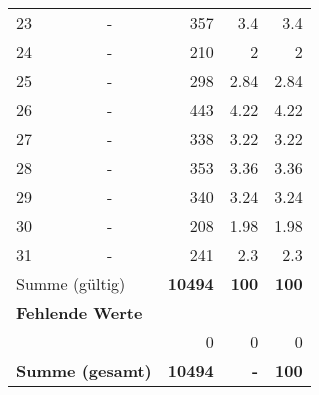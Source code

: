 \begin{longtable}{lXrrr}
        23 & \multicolumn{1}{X}{-} & %
          \num{357} &
          \num[round-mode=places,round-precision=2]{3,4} &
          \num[round-mode=places,round-precision=2]{3,4} \\

        24 & \multicolumn{1}{X}{-} & %
          \num{210} &
          \num[round-mode=places,round-precision=2]{2} &
          \num[round-mode=places,round-precision=2]{2} \\

        25 & \multicolumn{1}{X}{-} & %
          \num{298} &
          \num[round-mode=places,round-precision=2]{2,84} &
          \num[round-mode=places,round-precision=2]{2,84} \\

        26 & \multicolumn{1}{X}{-} & %
          \num{443} &
          \num[round-mode=places,round-precision=2]{4,22} &
          \num[round-mode=places,round-precision=2]{4,22} \\

        27 & \multicolumn{1}{X}{-} & %
          \num{338} &
          \num[round-mode=places,round-precision=2]{3,22} &
          \num[round-mode=places,round-precision=2]{3,22} \\

        28 & \multicolumn{1}{X}{-} & %
          \num{353} &
          \num[round-mode=places,round-precision=2]{3,36} &
          \num[round-mode=places,round-precision=2]{3,36} \\

        29 & \multicolumn{1}{X}{-} & %
          \num{340} &
          \num[round-mode=places,round-precision=2]{3,24} &
          \num[round-mode=places,round-precision=2]{3,24} \\

        30 & \multicolumn{1}{X}{-} & %
          \num{208} &
          \num[round-mode=places,round-precision=2]{1,98} &
          \num[round-mode=places,round-precision=2]{1,98} \\

        31 & \multicolumn{1}{X}{-} & %
          \num{241} &
          \num[round-mode=places,round-precision=2]{2,3} &
          \num[round-mode=places,round-precision=2]{2,3} \\

     \midrule
     \multicolumn{2}{l}{Summe (gültig)} &
       \textbf{\num{10494}} &
     \textbf{100} &
       \textbf{\num[round-mode=places,round-precision=2]{100}} \\
     \multicolumn{5}{l}{\textbf{Fehlende Werte}}\\
      & & 0 & 0 & 0 \\
     \midrule
     \multicolumn{2}{l}{\textbf{Summe (gesamt)}} &
          \textbf{\num{10494}} &
        \textbf{-} &
        \textbf{100} \\
     \bottomrule
     \end{longtable}
     
